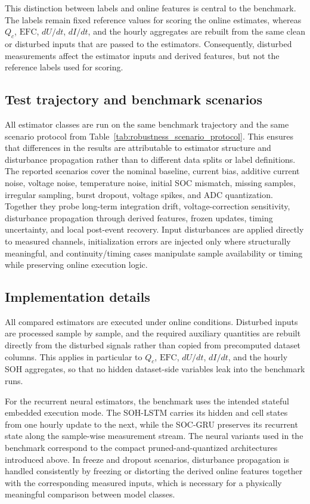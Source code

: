 \documentclass[
    a4paper,
    12pt,
    titlepage,
    bibliography=totoc,
    twoside=on,
    parskip=false,
    numbers=noenddot,
    cleardoublepage=empty,
    DIV=12,
    BCOR=12.0mm,
    headheight=36pt,
    headings=openright
]{scrreprt}
\begin{document}
This distinction between labels and online features is central to the benchmark. The labels remain fixed reference values for scoring the online estimates, whereas $Q_c$, $\mathrm{EFC}$, $dU/dt$, $dI/dt$, and the hourly aggregates are rebuilt from the same clean or disturbed inputs that are passed to the estimators. Consequently, disturbed measurements affect the estimator inputs and derived features, but not the reference labels used for scoring.

\subsection{Test trajectory and benchmark scenarios}
All estimator classes are run on the same benchmark trajectory and the same scenario protocol from Table~\ref{tab:robustness_scenario_protocol}. This ensures that differences in the results are attributable to estimator structure and disturbance propagation rather than to different data splits or label definitions. The reported scenarios cover the nominal baseline, current bias, additive current noise, voltage noise, temperature noise, initial SOC mismatch, missing samples, irregular sampling, burst dropout, voltage spikes, and ADC quantization. Together they probe long-term integration drift, voltage-correction sensitivity, disturbance propagation through derived features, frozen updates, timing uncertainty, and local post-event recovery. Input disturbances are applied directly to measured channels, initialization errors are injected only where structurally meaningful, and continuity/timing cases manipulate sample availability or timing while preserving online execution logic.

\subsection{Implementation details}
All compared estimators are executed under online conditions. Disturbed inputs are processed sample by sample, and the required auxiliary quantities are rebuilt directly from the disturbed signals rather than copied from precomputed dataset columns. This applies in particular to $Q_c$, $\mathrm{EFC}$, $dU/dt$, $dI/dt$, and the hourly SOH aggregates, so that no hidden dataset-side variables leak into the benchmark runs.

For the recurrent neural estimators, the benchmark uses the intended stateful embedded execution mode. The SOH-LSTM carries its hidden and cell states from one hourly update to the next, while the SOC-GRU preserves its recurrent state along the sample-wise measurement stream. The neural variants used in the benchmark correspond to the compact pruned-and-quantized architectures introduced above. In freeze and dropout scenarios, disturbance propagation is handled consistently by freezing or distorting the derived online features together with the corresponding measured inputs, which is necessary for a physically meaningful comparison between model classes.
\end{document}
